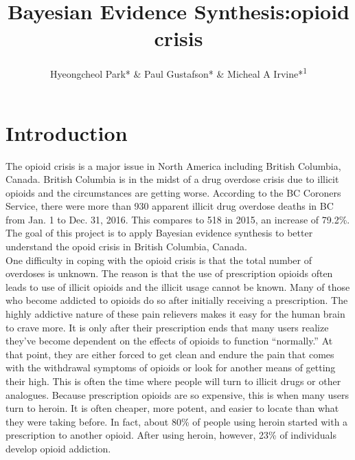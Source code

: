 \documentclass[]{article}
\title{Bayesian Evidence Synthesis:opioid crisis}
\author{Hyeongcheol Park* \& Paul Gustafson* \& Micheal A Irvine*\textsuperscript{1}}
\begin{document}
\maketitle{}
\tableofcontents %
\listoffigures %
\listoftables %


\begin{abstract}

\end{abstract}

\section{Introduction}
The opioid crisis is a major issue in North America including British Columbia, Canada. British Columbia is in the midst of a drug overdose crisis due to illicit opioids and the circumstances are getting worse. According to the BC Coroners Service, there were more than 930 apparent illicit drug overdose deaths in BC from Jan. 1 to Dec. 31, 2016. This compares to 518 in 2015, an increase of 79.2\%. \cite{bccdc_opioid}  The goal of this project is to apply Bayesian evidence synthesis to better understand the opoid crisis in British Columbia, Canada.  \\ 

One difficulty in coping with the opioid crisis is that the total number of overdoses is unknown. The reason is that the use of prescription opioids often leads to use of illicit opioids and the illicit usage cannot be known. Many of those who become addicted to opioids do so after initially receiving a prescription. The highly addictive nature of these pain relievers makes it easy for the human brain to crave more. It is only after their prescription ends that many users realize they’ve become dependent on the effects of opioids  to function “normally.” At that point, they are either forced to get clean and endure the pain that comes with the withdrawal symptoms of opioids or look for another means of getting their high. This is often the time where people will turn to illicit drugs or other analogues. Because prescription opioids are so expensive, this is when many users turn to heroin. It is often cheaper, more potent, and easier to locate than what they were taking before. In fact, about 80\% of people using heroin started with a prescription to another opioid. After using heroin, however, 23\% of individuals develop opioid addiction.\cite{opioid_desc} \\
\end{document}
